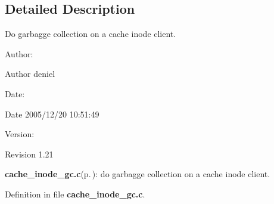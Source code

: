 \subsection{Detailed Description}
Do garbagge collection on a cache inode client. 

\begin{Desc}
\item[Author:]\begin{Desc}
\item[Author]deniel \end{Desc}
\end{Desc}
\begin{Desc}
\item[Date:]\begin{Desc}
\item[Date]2005/12/20 10:51:49 \end{Desc}
\end{Desc}
\begin{Desc}
\item[Version:]\begin{Desc}
\item[Revision]1.21 \end{Desc}
\end{Desc}
{\bf cache\_\-inode\_\-gc.c}{\rm (p.\,\pageref{cache__inode__gc_8c})}: do garbagge collection on a cache inode client.

Definition in file {\bf cache\_\-inode\_\-gc.c}.